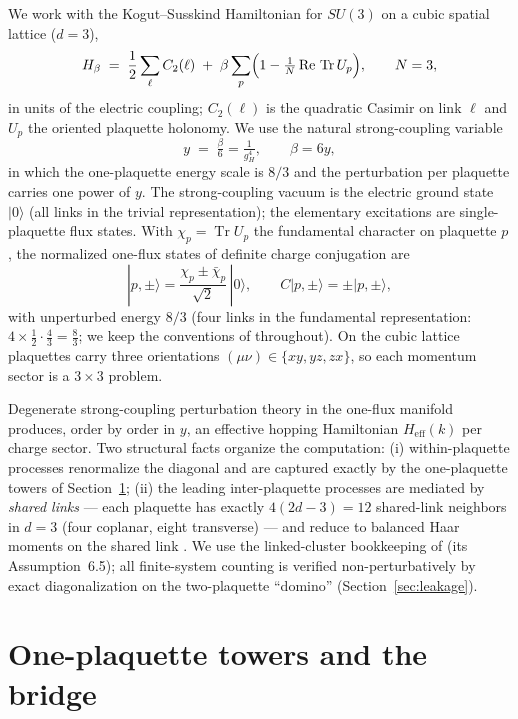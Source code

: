 \documentclass[11pt]{article}
\newcommand{\Tr}{\operatorname{Tr}}
\newcommand{\ket}[1]{|#1\rangle}
\begin{document}
We work with the Kogut--Susskind Hamiltonian \cite{KogutSusskind1975} for
$SU(3)$ on a cubic spatial lattice ($d=3$),
\begin{equation}
H_\beta \;=\; \frac12\sum_{\ell} C_2(\ell)\;+\;\beta\sum_{p}
\Bigl(1-\tfrac1N\,\mathrm{Re}\,\Tr U_p\Bigr),\qquad N=3,
\label{eq:H}
\end{equation}
in units of the electric coupling; $C_2(\ell)$ is the quadratic Casimir on
link $\ell$ and $U_p$ the oriented plaquette holonomy. We use the natural
strong-coupling variable
\begin{equation}
y \;=\; \tfrac{\beta}{6}=\tfrac{1}{g_H^4}, \qquad \beta=6y,
\end{equation}
in which the one-plaquette energy scale is $8/3$ and the perturbation per
plaquette carries one power of $y$. The strong-coupling vacuum is the
electric ground state $\ket{0}$ (all links in the trivial representation);
the elementary excitations are single-plaquette flux states. With
$\chi_p=\Tr U_p$ the fundamental character on plaquette $p$, the normalized
one-flux states of definite charge conjugation are
\begin{equation}
\ket{p,\pm}=\frac{\chi_p\pm\bar\chi_p}{\sqrt2}\,\ket{0},
\qquad C\ket{p,\pm}=\pm\ket{p,\pm},
\end{equation}
with unperturbed energy $8/3$ (four links in the fundamental representation:
$4\times\tfrac12\cdot\tfrac43=\tfrac83$; we keep the conventions of
\cite{companion} throughout). On the cubic lattice plaquettes carry three
orientations $(\mu\nu)\in\{xy,yz,zx\}$, so each momentum sector is a
$3\times3$ problem.

Degenerate strong-coupling perturbation theory in the one-flux manifold
produces, order by order in $y$, an effective hopping Hamiltonian
$H_{\mathrm{eff}}(k)$ per charge sector. Two structural facts organize the
computation: (i) within-plaquette processes renormalize the diagonal and are
captured exactly by the one-plaquette towers of Section~\ref{sec:towers};
(ii) the leading inter-plaquette processes are mediated by \emph{shared
links} --- each plaquette has exactly $4(2d-3)=12$ shared-link neighbors in
$d=3$ (four coplanar, eight transverse) --- and reduce to balanced Haar
moments on the shared link \cite{companion}. We use the linked-cluster
bookkeeping of \cite{companion} (its Assumption~6.5); all finite-system
counting is verified non-perturbatively by exact diagonalization on the
two-plaquette ``domino'' (Section~\ref{sec:leakage}).

\section{One-plaquette towers and the bridge}
\label{sec:towers}
\end{document}
